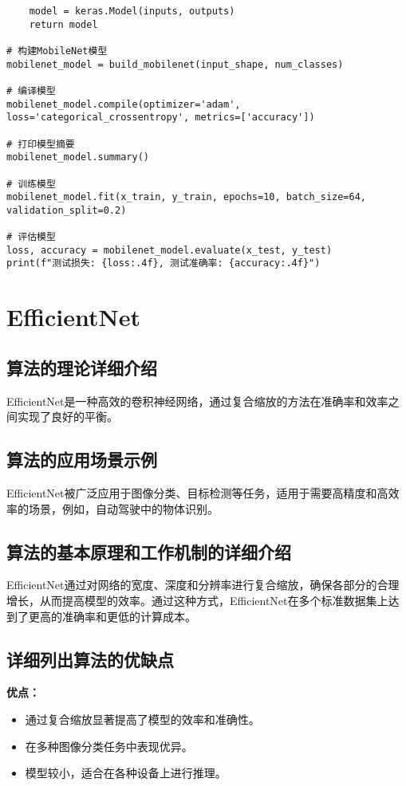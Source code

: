 \begin{lstlisting}
    model = keras.Model(inputs, outputs)
    return model

# 构建MobileNet模型
mobilenet_model = build_mobilenet(input_shape, num_classes)

# 编译模型
mobilenet_model.compile(optimizer='adam', loss='categorical_crossentropy', metrics=['accuracy'])

# 打印模型摘要
mobilenet_model.summary()

# 训练模型
mobilenet_model.fit(x_train, y_train, epochs=10, batch_size=64, validation_split=0.2)

# 评估模型
loss, accuracy = mobilenet_model.evaluate(x_test, y_test)
print(f"测试损失: {loss:.4f}, 测试准确率: {accuracy:.4f}")

\end{lstlisting}


\section{EfficientNet}
\subsection*{算法的理论详细介绍}
EfficientNet是一种高效的卷积神经网络，通过复合缩放的方法在准确率和效率之间实现了良好的平衡。

\subsection*{算法的应用场景示例}
EfficientNet被广泛应用于图像分类、目标检测等任务，适用于需要高精度和高效率的场景，例如，自动驾驶中的物体识别。

\subsection*{算法的基本原理和工作机制的详细介绍}
EfficientNet通过对网络的宽度、深度和分辨率进行复合缩放，确保各部分的合理增长，从而提高模型的效率。通过这种方式，EfficientNet在多个标准数据集上达到了更高的准确率和更低的计算成本。

\subsection*{详细列出算法的优缺点}
\textbf{优点：}
\begin{itemize}
    \item 通过复合缩放显著提高了模型的效率和准确性。
    \item 在多种图像分类任务中表现优异。
    \item 模型较小，适合在各种设备上进行推理。
\end{itemize}

